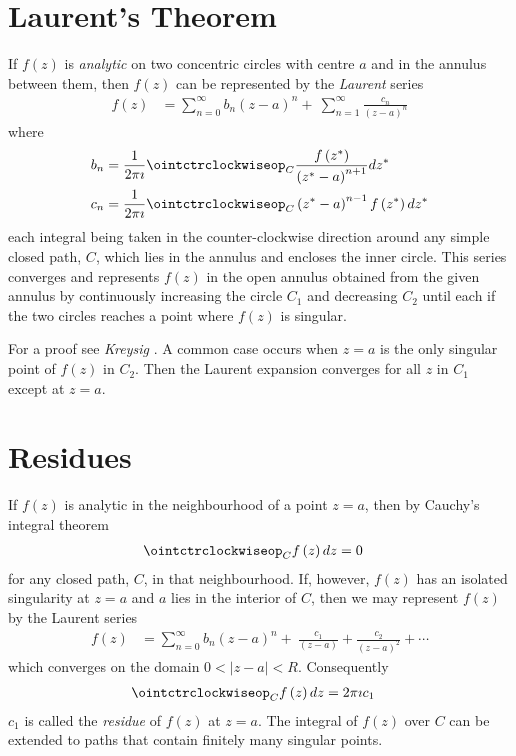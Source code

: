 \documentclass[a4paper,twoside,10pt,english]{report}
\begin{document}
\section{Laurent's Theorem}
If $f\left(z\right)$ is \emph{analytic} on two concentric circles with centre
$a$ and in the annulus between them, then $f\left(z\right)$ can be represented
by the \emph{Laurent} series
\begin{align*}
f\left(z\right)&=\sum^{\infty}_{n=0}b_{n}\left(z-a\right)^{n}+\
\sum^{\infty}_{n=1}\frac{c_{n}}{\left(z-a\right)^{n}}
\end{align*}
where
\begin{align*}
b_{n}&=\frac{1}{2\pi\imath}\ointctrclockwiseop_{C}\frac{f\left(z^{*}\right)}{\left(z^{*}-a\right)^{n+1}}dz^{*}\\
c_{n}&=\frac{1}{2\pi\imath}\ointctrclockwiseop_{C}\left(z^{*}-a\right)^{n-1}f\left(z^{*}\right)dz^{*}
\end{align*}
each integral being taken in the counter-clockwise direction around any simple
closed path, $C$, which lies in the annulus and encloses the inner circle. This
series converges and represents $f\left(z\right)$ in the open annulus obtained
from the given annulus by continuously increasing the circle $C_{1}$ and
decreasing $C_{2}$ until each if the two circles reaches a point where 
$f\left(z\right)$ is singular. 

For a proof see \emph{Kreysig} 
\cite[Section 16.7]{KreyzigAdvancedEngineeringMathematics}. A common case
occurs when $z=a$ is the only singular point of $f\left(z\right)$ in $C_{2}$.
Then the Laurent expansion converges for all $z$ in $C_{1}$ except at $z=a$.

\section{Residues}
If $f\left(z\right)$ is analytic in the neighbourhood of a point $z=a$,
then by Cauchy's integral theorem
\begin{align*}
\ointctrclockwiseop_{C}f\left(z\right)dz&=0
\end{align*}
for any closed path, $C$, in that neighbourhood. If, however, $f\left(z\right)$
has an isolated singularity at $z=a$ and $a$ lies in the interior of $C$, then
we may represent $f\left(z\right)$ by the Laurent series
\begin{align*}
f\left(z\right)&=\sum^{\infty}_{n=0}b_{n}\left(z-a\right)^{n}+\
\frac{c_{1}}{\left(z-a\right)}+\frac{c_{2}}{\left(z-a\right)^{2}}+\cdots
\end{align*}
which converges on the domain $0<\left|z-a\right|<R$. Consequently
\begin{align*}
\ointctrclockwiseop_{C}f\left(z\right)dz&=2\pi\imath c_{1}
\end{align*}
$c_{1}$ is called the \emph{residue} of $f\left(z\right)$ at $z=a$. The 
integral of $f\left(z\right)$ over $C$ can be extended to paths that contain
finitely many singular points.
\end{document}
